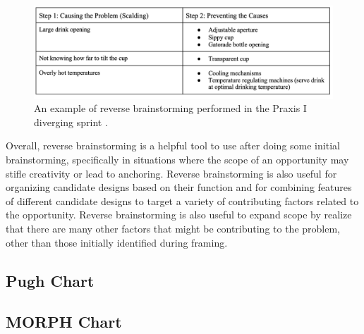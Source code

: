 \documentclass{report}
\begin{document}
\begin{figure}[h]
    \centering
    \includegraphics[width=\textwidth/2]{images/reversebrainstorm.png}
    \hfill
    \caption{An example of reverse brainstorming performed in the Praxis I diverging sprint \cite{candidatestools}.}
\end{figure}

Overall, reverse brainstorming is a helpful tool to use after doing some initial brainstorming, specifically 
in situations where the scope of an opportunity may stifle creativity or lead to anchoring. Reverse 
brainstorming is also useful for organizing candidate designs based on their function and for combining 
features of different candidate designs to target a variety of contributing factors related to the opportunity. 
Reverse brainstorming is also useful to expand scope by realize that there are many 
other factors that might be contributing to the problem, other than those initially identified during framing.

\subsection{Pugh Chart}



\subsection{MORPH Chart}

\pagebreak




\end{document}
